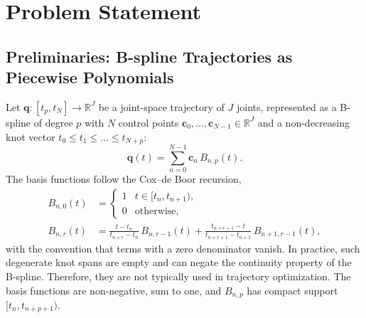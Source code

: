 \documentclass[final,5p,times,twocolumn]{elsarticle}
\theoremstyle{definition}
\begin{document}
\section{Problem Statement} \label{sec:problem_statement}

\subsection{Preliminaries: B-spline Trajectories as Piecewise Polynomials}
\label{sec:bspline_pp}

Let $\mathbf{q}:[t_p,t_N]\to\mathbb{R}^J$ be a joint-space trajectory of $J$ joints, represented as a B-spline of degree $p$ with $N$ control points $\mathbf{c}_0,\dots,\mathbf{c}_{N-1}\in\mathbb{R}^J$ and a non-decreasing knot vector $t_0\le t_1\le\dots\le t_{N+p}$:
\begin{equation}
  \mathbf{q}(t)=\sum_{n=0}^{N-1}\mathbf{c}_n\,B_{n,p}(t).
  \label{eq:bspline}
\end{equation}
The basis functions follow the Cox--de Boor recursion,
\begin{align}
  B_{n,0}(t) &=
  \begin{cases}
    1 & t\in[t_n,t_{n+1}),\\
    0 & \text{otherwise,}
  \end{cases}\\
  B_{n,r}(t) &= \frac{t-t_n}{t_{n+r}-t_n}\,B_{n,r-1}(t)
              + \frac{t_{n+r+1}-t}{t_{n+r+1}-t_{n+1}}\,B_{n+1,r-1}(t),
\end{align}
with the convention that terms with a zero denominator vanish. In practice, such degenerate knot spans are empty and can negate the continuity property of the B-spline. Therefore, they are not typically used in trajectory optimization. The basis functions are non-negative, sum to one, and $B_{n,p}$ has compact support $[t_n,t_{n+p+1})$.
\end{document}

